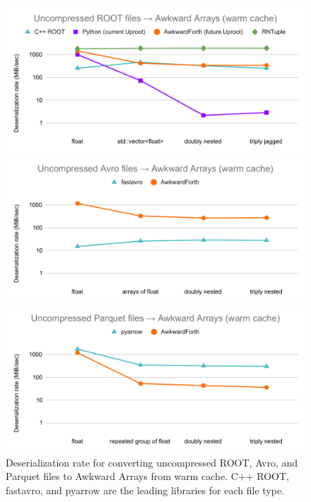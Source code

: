 \documentclass{webofc}
\begin{document}
\begin{figure}[p]
\includegraphics[width=\linewidth]{AwkwardForth-performance-ROOT.pdf}

\includegraphics[width=\linewidth]{AwkwardForth-performance-Avro.pdf}

\includegraphics[width=\linewidth]{AwkwardForth-performance-Parquet.pdf}

\caption{Deserialization rate for converting uncompressed ROOT, Avro, and Parquet files to Awkward Arrays from warm cache. C++ ROOT, fastavro, and pyarrow are the leading libraries for each file type. \label{fig:performance}}
\end{figure}
\end{document}
